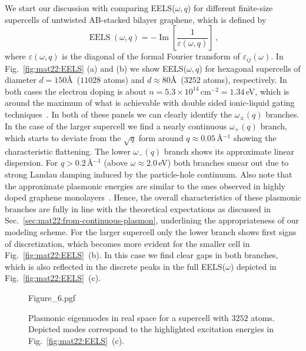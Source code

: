 We start our discussion with comparing EELS($\omega,q$) for different finite-size supercells of untwisted AB-stacked bilayer graphene, which is defined by
\begin{equation*}
    \operatorname{EELS}(\omega, q) = -\operatorname{Im}\left[ \frac{1}{\varepsilon(\omega, q)} \right] \,,
\end{equation*}
where $\varepsilon(\omega, q)$ is the diagonal of the formal Fourier transform of $\varepsilon_{ij}(\omega)$. In Fig.~\ref{fig:mat22:EELS} (a) and (b) we show EELS($\omega,q$) for hexagonal supercells of diameter $d=150$\AA\ ($11028$ atoms) and $d\approx80$\AA\ ($3252$ atoms), respectively. In both cases the electron doping is about $n = 5.3\times10^{14}\,$cm$^{-2} = 1.34\,$eV, which is around the maximum of what is achievable with double sided ionic-liquid gating techniques~\cite{zheliuk_josephson_2019}. In both of these panels we can clearly identify the $\omega_\pm(q)$ branches. In the case of the larger supercell we find a nearly continuous $\omega_+(q)$ branch, which starts to deviate from the $\sqrt{q}$ form around $q\approx 0.05\,$\AA$^{-1}$ showing the characteristic flattening. The lower $\omega_-(q)$ branch shows its approximate linear dispersion. For $q >0.2\,$\AA$^{-1}$ (above $\omega \approx 2.0\,$eV) both branches smear out due to strong Landau damping induced by the particle-hole continuum. Also note that the approximate plasmonic energies are similar to the ones observed in highly doped graphene monolayers~\cite{shin_control_2011}. Hence, the overall characteristics of these plasmonic branches are fully in line with the theoretical expectations as discussed in Sec.~\ref{sec:mat22:from-continuous-plasmon}, underlining the appropriateness of our modeling scheme. For the larger supercell only the lower branch shows first signs of discretization, which becomes more evident for the smaller cell in Fig.~\ref{fig:mat22:EELS}~(b). In this case we find clear gaps in both branches, which is also reflected in the discrete peaks in the full EELS($\omega$) depicted in Fig.~\ref{fig:mat22:EELS}~(c).

\begin{figure}
    \centering
    {Figure_6.pgf}
    \caption{Plasmonic eigenmodes in real space for a supercell with $3252$ atoms. Depicted modes correspond to the highlighted excitation energies in Fig.~\ref{fig:mat22:EELS}~(c).}
    \label{fig:mat22:modes}
\end{figure}

